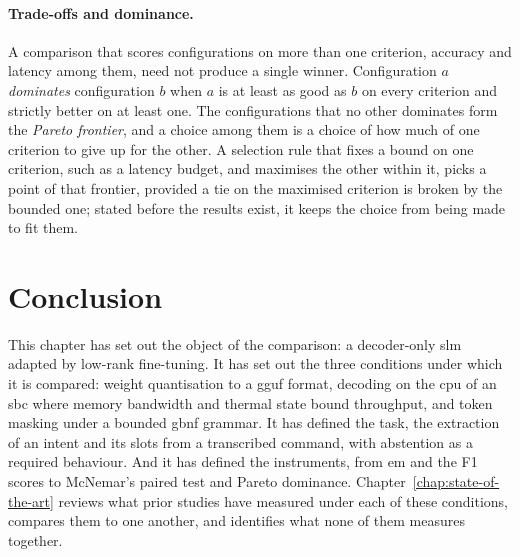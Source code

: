 \paragraph{Trade-offs and dominance.} A comparison that scores configurations on more than one
criterion, accuracy and latency among them, need not produce a single winner. Configuration $a$
\emph{dominates} configuration $b$ when $a$ is at least as good as $b$ on every criterion and
strictly better on at least one. The configurations that no other dominates form the
\emph{Pareto frontier}, and a choice among them is a choice of how much of one criterion to give
up for the other. A selection rule that fixes a bound on one criterion, such as a latency budget,
and maximises the other within it, picks a point of that frontier, provided a tie on the
maximised criterion is broken by the bounded one; stated before the results exist, it keeps the
choice from being made to fit them.

\section{Conclusion}
\label{sec:bg-conclusion}

This chapter has set out the object of the comparison: a decoder-only \gls{slm} adapted by
low-rank fine-tuning. It has set out the three conditions under which it is compared: weight
quantisation to a \gls{gguf} format, decoding on the \gls{cpu} of an \gls{sbc} where memory
bandwidth and thermal state bound throughput, and token masking under a bounded \gls{gbnf}
grammar. It has defined the task, the extraction of an intent and its slots from a transcribed
command, with abstention as a required behaviour. And it has defined the instruments, from
\gls{em} and the F1 scores to McNemar's paired test and Pareto dominance. Chapter~\ref{chap:state-of-the-art} reviews what prior studies have measured
under each of these conditions, compares them to one another, and identifies what none of them
measures together.
